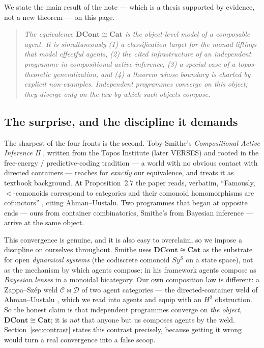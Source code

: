 \documentclass[11pt]{amsart}
\theoremstyle{plain}
\theoremstyle{definition}
\newcommand{\C}{\mathcal{C}}
\newcommand{\D}{\mathcal{D}}
\newcommand{\Cat}{\mathbf{Cat}}
\newcommand{\DCont}{\mathbf{DCont}}
\newcommand{\seq}{\vartriangleleft}
\newcommand{\iso}{\cong}
\begin{document}
We state the main result of the note --- which is a thesis supported by evidence, not a new
theorem --- on this page.

\begin{quote}\itshape
The equivalence $\DCont\iso\Cat$ is the object-level model of a composable agent. It is
simultaneously (1) a classification target for the monad liftings that model effectful agents,
(2) the cited infrastructure of an independent programme in compositional active inference, (3)
a special case of a topos-theoretic generalization, and (4) a theorem whose boundary is charted
by explicit non-examples. Independent programmes converge on this object; they diverge only on
the law by which such objects compose.
\end{quote}

\subsection*{The surprise, and the discipline it demands}
The sharpest of the four fronts is the second. Toby Smithe's \emph{Compositional Active
Inference II} \cite{SmitheCAI2}, written from the Topos Institute (later VERSES) and rooted in
the free-energy / predictive-coding tradition --- a world with no obvious contact with directed
containers --- reaches for \emph{exactly} our equivalence, and treats it as textbook background.
At Proposition~2.7 the paper reads, verbatim, ``Famously, $\seq$-comonoids correspond to
categories and their comonoid homomorphisms are cofunctors'' \cite[Prop.~2.7]{SmitheCAI2},
citing Ahman--Uustalu. Two programmes that began at opposite ends --- ours from container
combinatorics, Smithe's from Bayesian inference --- arrive at the same object.

This convergence is genuine, and it is also easy to overclaim, so we impose a discipline on
ourselves throughout. Smithe uses $\DCont\iso\Cat$ as the substrate for open \emph{dynamical
systems} (the codiscrete comonoid $S y^S$ on a state space), not as the mechanism by which
agents compose; in his framework agents compose as \emph{Bayesian lenses} in a monoidal
bicategory. Our own composition law is different: a Zappa--Sz\'ep weld $\C\bowtie\D$ of two agent
categories --- the directed-container weld of Ahman--Uustalu \cite{AhmanUustaluDL}, which we
read into agents and equip with an $H^2$ obstruction. So the honest claim is that independent programmes
converge on \emph{the object}, $\DCont\iso\Cat$; it is \emph{not} that anyone but us composes
agents by the weld. Section~\ref{sec:contrast} states this contrast precisely, because getting
it wrong would turn a real convergence into a false scoop.
\end{document}

